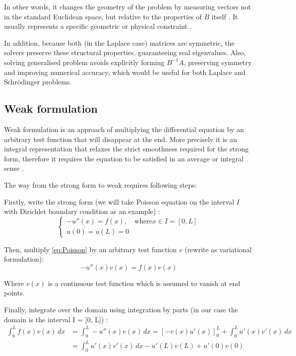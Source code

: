 \documentclass[acmsmall,screen]{MapleTrans}
\begin{document}
In other words, it changes the geometry of the problem by measuring vectors not in the standard Euclidean space, but relative to the properties of $B$ itself \cite{b1}. It usually represents a specific geometric or physical constraint \cite{b2}. 

In addition, because both (in the Laplace case) matrices are symmetric, the solvers preserve these structural properties, guaranteeing real eigenvalues. Also, solving generalised problem avoids explicitly forming $B^{-1}A$, preserving symmetry and improving numerical accuracy, which would be useful for both Laplace and Schr\"{o}dinger problems.


\subsection{Weak formulation}
Weak formulation is an approach of multiplying the differential equation by an arbitrary test function that will disappear at the end. 
More precisely it is an integral representation that relaxes the strict smoothness required for the strong form, therefore it requires the equation to be satisfied in an average or integral sense \cite{b4}.

The way from the strong form to weak requires following steps:

Firstly, write the strong form (we will take Poisson equation on the interval $I$ with Dirichlet boundary condition as an example) \cite{b4.1}:
\begin{equation}
\begin{cases}
    -u''(x) = f(x), \quad \text{where} x \in I = [0, L] \\
    u(0) = u(L) = 0
    \label{eq:Poisson}
\end{cases}
\end{equation}

Then, multiply \eqref{eq:Poisson} by an arbitrary test function $v$ (rewrite as variational formulation):
\begin{equation}
    -u''(x)v(x) = f(x)v(x)
\end{equation}

Where $v(x)$ is a continuous test function which is assumed to vanish at end points.

Finally, integrate over the domain using integration by parts (in our case the domain is the interval I = [0, L]) \cite{b10}:
\begin{equation}
\begin{aligned}
    \int_{0}^{L}f(x) v(x) \, dx
        &= \int_{0}^{L}-u''(x) v(x) \, dx
         = \left[ -v(x) u'(x) \right]_{0}^{L} + \int_{0}^{L}u'(x) v'(x) \, dx \\
        &= \int_{0}^{L}u'(x) v'(x) \, dx - u'(L) v(L) + u'(0) v(0)
\end{aligned}
\end{equation}
\end{document}
